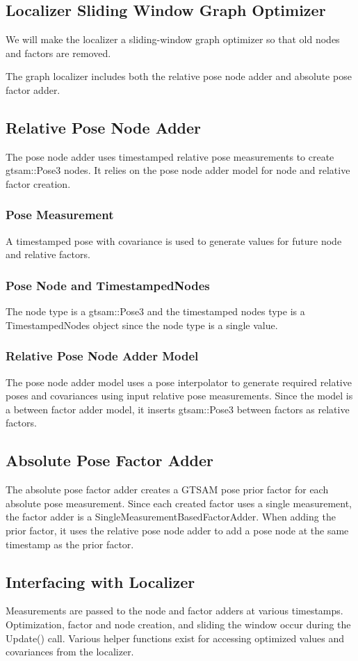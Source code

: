 \subsection{Localizer Sliding Window Graph Optimizer}
We will make the localizer a sliding-window graph optimizer so that old nodes and factors are removed. 

The graph localizer includes both the relative pose node adder and absolute pose factor adder. 

\subsection{Relative Pose Node Adder}
The pose node adder uses timestamped relative pose measurements to create gtsam::Pose3 nodes. 
It relies on the pose node adder model for node and relative factor creation.

\subsubsection{Pose Measurement}
A timestamped pose with covariance is used to generate values for future node and relative factors.
\subsubsection{Pose Node and TimestampedNodes}
The node type is a gtsam::Pose3 and the timestamped nodes type is a TimestampedNodes object since the node type is a single value.
\subsubsection{Relative Pose Node Adder Model}

The pose node adder model uses a pose interpolator to generate required relative poses and covariances using input relative pose measurements.
Since the model is a between factor adder model, it inserts gtsam::Pose3 between factors as relative factors.
\subsection{Absolute Pose Factor Adder}
The absolute pose factor adder creates a GTSAM pose prior factor for each absolute pose measurement.
Since each created factor uses a single measurement, the factor adder is a SingleMeasurementBasedFactorAdder.
When adding the prior factor, it uses the relative pose node adder to add a pose node at the same timestamp as the prior factor.

\subsection{Interfacing with Localizer}
Measurements are passed to the node and factor adders at various timestamps. 
Optimization, factor and node creation, and sliding the window occur during the Update() call.
Various helper functions exist for accessing optimized values and covariances from the localizer.
